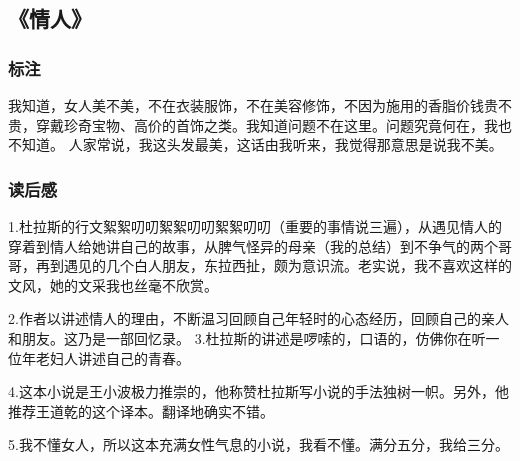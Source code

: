 \subsection{《情人》}
\subsubsection{标注}

我知道，女人美不美，不在衣装服饰，不在美容修饰，不因为施用的香脂价钱贵不贵，穿戴珍奇宝物、高价的首饰之类。我知道问题不在这里。问题究竟何在，我也不知道。
人家常说，我这头发最美，这话由我听来，我觉得那意思是说我不美。

\subsubsection{读后感}

1.杜拉斯的行文絮絮叨叨絮絮叨叨絮絮叨叨（重要的事情说三遍），从遇见情人的穿着到情人给她讲自己的故事，从脾气怪异的母亲（我的总结）到不争气的两个哥哥，再到遇见的几个白人朋友，东拉西扯，颇为意识流。老实说，我不喜欢这样的文风，她的文采我也丝毫不欣赏。

2.作者以讲述情人的理由，不断温习回顾自己年轻时的心态经历，回顾自己的亲人和朋友。这乃是一部回忆录。 
3.杜拉斯的讲述是啰嗦的，口语的，仿佛你在听一位年老妇人讲述自己的青春。

4.这本小说是王小波极力推崇的，他称赞杜拉斯写小说的手法独树一帜。另外，他推荐王道乾的这个译本。翻译地确实不错。

5.我不懂女人，所以这本充满女性气息的小说，我看不懂。满分五分，我给三分。